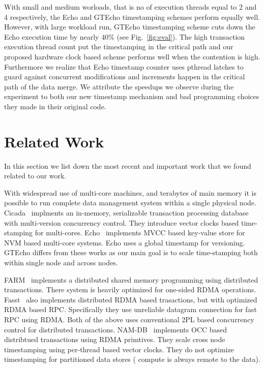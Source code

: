 With small and medium worloads, that is no of execution threads equal to 2 and 4 respectively,
the Echo and GTEcho timestamping schemes perform equally well. However, 
with large workload run, GTEcho timestamping scheme cuts down the Echo 
execution time by nearly 40\% (see Fig.~\ref{fig:eval}). The high transaction execution thread count 
put the timestamping in the critical path and our proposed hardware clock based scheme
performs well when the contention is high. Furthermore we realize that 
Echo timestamp counter uses pthread latches to guard against concurrent modifications and increments
happen in the critical path of the data merge. We attribute the speedups we observe
during the experiment to both our new timestamp mechanism and bad programming choices 
they made in their original code.


\section{Related Work}
In this section we list down the most recent and important work that we 
found related to our work. 

With widespread use of multi-core machines, and terabytes of main memory
it is possible to run complete data management system within a single 
physical node. Cicada~\cite{cicada} implments an in-memory, serializable
transaction processing database with multi-version concurrency control. They
introduce vector clocks based time-stamping for multi-cores. Echo~\cite{echo}
implements MVCC based key-value store for NVM based multi-core systems. Echo 
uses a global timestamp for versioning. GTEcho differs from these works as
our main goal is to scale time-stamping both within single node and across nodes.

FARM~\cite{farm} implements a distributed shared memory programming using distributed 
transactions. There system is heavily optimized for one-sided RDMA operations.
Fasst~\cite{fasst} also implements distributed RDMA based trasactions, but with 
optimized RDMA based RPC. Specifically they use unreliable datagram connection
for fast RPC using RDMA. Both of the above uses conventional 2PL based concurrency
control for distributed transactions. NAM-DB~\cite{namdb} implements OCC based 
distribtued transactions using RDMA primtives. They scale cross node timestamping
using per-thread based vector clocks. They do not optimize timestamping for 
partitioned data stores ( compute is always remote to the data).

